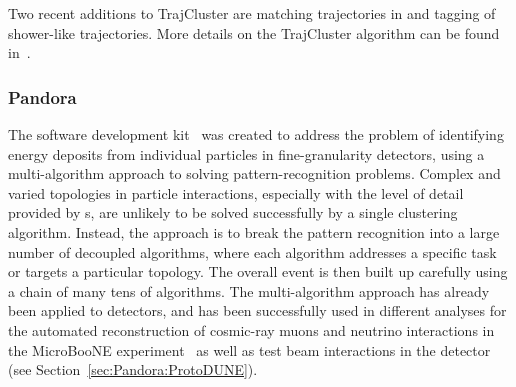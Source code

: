 Two recent additions to TrajCluster are matching trajectories in \threed and tagging of shower-like trajectories. More details on the TrajCluster algorithm can be found in~\cite{ref:trajcluster}.



\subsubsection{Pandora}\label{sec:Pandora}

The  software development kit~\cite{Marshall:2015rfa} was created to address the problem of identifying energy deposits from individual particles in fine-granularity detectors, using a multi-algorithm approach to solving pattern-recognition problems. Complex and varied topologies in particle interactions, especially with the level of detail provided by \lartpc{}s, are unlikely to be solved successfully by a single clustering algorithm. Instead, the  approach is to break the pattern recognition into a large number of decoupled algorithms, where each algorithm addresses a specific task or targets a particular topology. The overall event is then built up carefully using a chain of many tens of algorithms. The  multi-algorithm approach has already been applied to \lartpc{} detectors, and has been successfully used in different analyses for the automated reconstruction of cosmic-ray muons and neutrino interactions in the MicroBooNE experiment~\cite{Acciarri:2017hat} as well as test beam interactions in the  detector (see Section~\ref{sec:Pandora:ProtoDUNE}).




